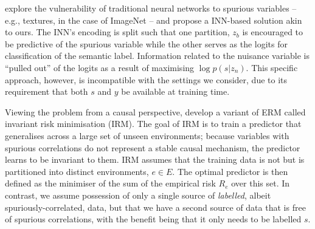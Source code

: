 \citet{JacBehZemBet19} explore the vulnerability of traditional neural networks to spurious
variables -- e.g., textures, in the case of ImageNet \citep{Geir18} -- and propose a \ac{INN}-based
solution akin to ours. The \ac{INN}'s encoding is split such that one partition, $z_b$ is encouraged to
be predictive of the spurious variable while the other serves as the logits for classification of
the semantic label. Information related to the nuisance variable is ``pulled out'' of the logits as
a result of maximising $\log p(s|z_n)$. This specific approach, however, is incompatible with the
settings we consider, due to its requirement that both $s$ and $y$ be available at training time.

Viewing the problem from a causal perspective, \citet{arjovsky2019invariant} develop a variant of
\acl{ERM} called invariant risk minimisation (IRM).
%
The goal of IRM is to train a predictor that generalises across a large set of unseen environments;
because variables with spurious correlations do not represent a stable causal mechanism, the
predictor learns to be invariant to them.
%
IRM assumes that the training data is not \emph{\iid{}} but is partitioned into distinct
environments, $e \in E$.
%
The optimal predictor is then defined as the minimiser of the sum of the empirical risk $R_e$ over
this set.
%
In contrast, we assume possession of only a single source of \emph{labelled}, albeit
spuriously-correlated, data, but that we have a second source of data that is free of spurious
correlations, with the benefit being that it only needs to be labelled \emph{\wrt{} $s$}.


